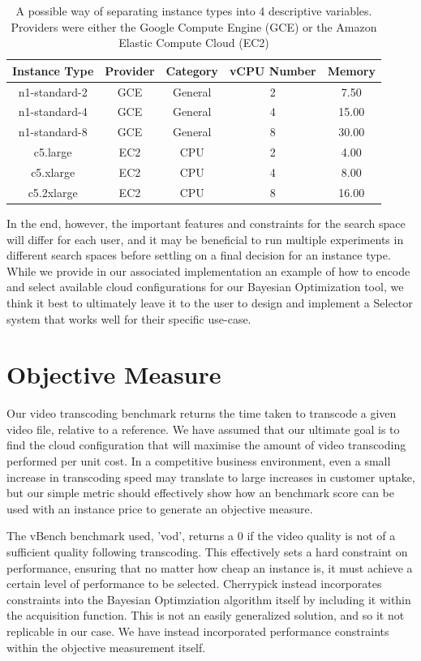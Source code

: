 \documentclass{report}
\begin{document}
\begin{table}[!t]
\centering
\begin{tabular}{ |c||c|c|c|c|  }
 \hline
 Instance Type & Provider & Category & vCPU Number & Memory \\
 \hline
 n1-standard-2    & GCE  & General & 2 & 7.50 \\
 n1-standard-4    & GCE  & General & 4 & 15.00 \\
 n1-standard-8    & GCE  & General & 8 & 30.00 \\
 c5.large         & EC2  & CPU & 2 & 4.00 \\
 c5.xlarge    & EC2  & CPU & 4 & 8.00 \\
 c5.2xlarge    & EC2  & CPU & 8 & 16.00 \\
 \hline
\end{tabular}
\caption{A possible way of separating instance types into 4 descriptive variables. Providers were either the Google Compute Engine (GCE) or the Amazon Elastic Compute Cloud (EC2)}
\label{tab:config-encode}
\end{table}

In the end,  however, the important features and constraints for the search space will differ for each user, and it may be beneficial to run multiple experiments in different search spaces before settling on a final decision for an instance type. While we provide in our associated implementation an example of how to encode and select available cloud configurations for our Bayesian Optimization tool, we think it best to ultimately leave it to the user to design and implement a Selector system that works well for their specific use-case.
\section{Objective Measure}
Our video transcoding benchmark returns the time taken to transcode a given video file, relative to a reference. We have assumed that our ultimate goal is to find the cloud configuration that will maximise the amount of video transcoding performed per unit cost.  In a competitive business environment, even a small increase in transcoding speed may translate to large increases in customer uptake, but our simple metric should effectively show how an benchmark score can be used with an instance price to generate an objective measure.

The vBench benchmark used, 'vod', returns a 0 if the video quality is not of a sufficient quality following transcoding. This effectively sets a hard constraint on performance, ensuring that no matter how cheap an instance is, it must achieve a certain level of performance to be selected.
Cherrypick\cite{Alipourfard2017} instead incorporates constraints into the Bayesian Optimziation algorithm itself by including it within the acquisition function. This is not an easily generalized solution, and so it not replicable in our case. We have instead incorporated performance constraints within the objective measurement itself.
\end{document}
